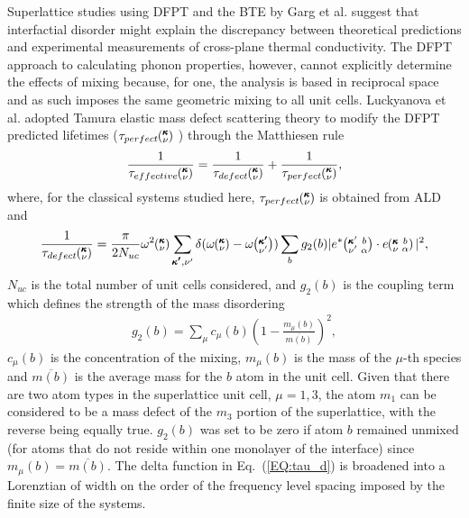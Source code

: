 Superlattice studies using DFPT and the BTE by Garg et al. suggest that interfactial disorder might explain the discrepancy between theoretical predictions and experimental measurements of cross-plane thermal conductivity. \cite{doi:10.1021/nl202186y}  The DFPT approach to calculating phonon properties, however, cannot explicitly determine the effects of mixing because, for one, the analysis is based in reciprocal space and as such imposes the same geometric mixing to all unit cells. Luckyanova et al. \cite{Luckyanova16112012} adopted Tamura elastic mass defect scattering theory \cite{tamura_isotope_1983} to modify the DFPT predicted lifetimes  ($\tau_{perfect}\mspace{-4.0mu}\left(\mspace{-8.0mu} \begin{smallmatrix}&\pmb{\kappa} \\&\nu\end{smallmatrix} \mspace{-3.0mu}\right)$ ) through the Matthiesen rule
\begin{equation}\label{EQ:tau_eff}
\begin{split}
\frac{1}{\tau_{effective}\kv} = \frac{1}{\tau_{defect}\kv}+\frac{1}{\tau_{perfect}\kv} ,
\end{split}
\end{equation}
where, for the classical systems studied here, $\tau_{perfect}\mspace{-4.0mu}\left(\mspace{-8.0mu} \begin{smallmatrix}&\pmb{\kappa} \\&\nu\end{smallmatrix} \mspace{-3.0mu}\right)$ is obtained from ALD and
\begin{equation}\label{EQ:tau_d}
\begin{split}
\frac{1}{\tau_{defect}\kv} = \frac{\pi}{2N_{uc}}\omega^2\kv 
\sum_{\pmb{\kappa'},\nu'} \delta( \omega\kv - \omega\kvp )\sum_{b} g_2(b) 
|e^*\kvbap \cdot e\kvba |^2 ,
\end{split}
\end{equation}
$N_{uc}$ is the total number of unit cells considered, and $g_2(b)$ is the coupling term which defines the strength of the mass disordering
\begin{equation}\label{EQ:g(b)}
\begin{split}
g_2(b) = \sum_\mu c_{\mu}(b)\left(1-\frac{m_{\mu}(b)}{\overline{m(b)}}\right)^2, 
\end{split}
\end{equation}
$c_\mu(b)$ is the concentration of the mixing, $m_\mu(b)$ is the mass of the $\mu$-th species and $\overline{m(b)}$ is the average mass for the $b$ atom in the unit cell. Given that there are two atom types in the superlattice unit cell, $\mu=1,3$, the atom $m_1$ can be considered to be a mass defect of the $m_3$ portion of the superlattice, with the reverse being equally true. $g_2(b)$ was set to be zero if atom $b$ remained unmixed (for atoms that do not reside within one monolayer of the interface) since $m_{\mu}(b)=\overline{m(b)}$. The delta function in Eq.~(\ref{EQ:tau_d}) is broadened into a Lorenztian of width on the order of the frequency level spacing imposed by the finite size of the systems.\cite{allen_thermal_1993}

